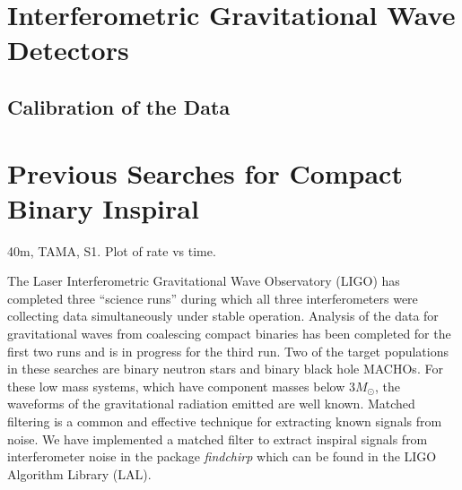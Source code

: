 \section{Interferometric Gravitational Wave Detectors}
\label{s:ifo}

\subsection{Calibration of the Data}
\label{ss:calibration}

\section{Previous Searches for Compact Binary Inspiral}

40m, TAMA, S1. Plot of rate vs time.


The Laser Interferometric Gravitational Wave Observatory (LIGO)\cite{barish}
has completed three ``science runs'' during which all three interferometers
were collecting data simultaneously under stable operation. Analysis of the
data for gravitational waves from coalescing compact binaries has been
completed for the first two runs\cite{bns1,bns2,macho} and is in progress for
the third run. Two of the target populations in these searches are binary
neutron stars\cite{300yrs} and binary black hole
MACHOs\cite{sammacho,nakamura}. For these low mass systems, which have
component masses below $3 M_\odot$, the waveforms of the gravitational
radiation emitted are well known\cite{bdiww,biww}.  Matched filtering is a
common and effective technique for extracting known signals from
noise\cite{wz}. We have implemented a matched filter to extract inspiral
signals from interferometer noise in the package \emph{findchirp} which can be
found in the LIGO Algorithm Library (LAL)\cite{lal}.

